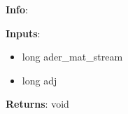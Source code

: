 \textbf{Info}:

\noindent \textbf{Inputs}:
\begin{itemize}
\item{long ader\_mat\_stream}
\item{long adj}
\end{itemize}

\noindent \textbf{Returns}: void
